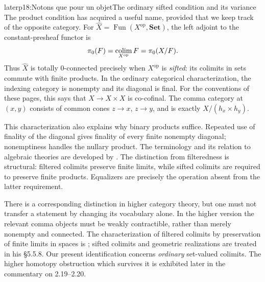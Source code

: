 \begin{dcomment}{later}{p18:Notons que pour un objet}{The ordinary sifted condition and its variance}
The product condition has acquired a useful name, provided that we keep track of the opposite category. For $\widehat X=\operatorname{Fun}(X^{\mathrm{op}},\mathbf {Set})$, the left adjoint to the constant-presheaf functor is
\[
 \pi _0(F)=\mathop{\rm colim}_{X^{\mathrm{op}}}F
          =\pi _0(X/F).
\]
Thus $\widehat X$ is totally $0$-connected precisely when $X^{\mathrm{op}}$ is \emph{sifted}: its colimits in sets commute with finite products. In the ordinary categorical characterization, the indexing category is nonempty and its diagonal is final. For the conventions of these pages, this says that $X\to X\times X$ is co-cofinal. The comma category at $(x,y)$ consists of common cones $z\to x$, $z\to y$, and is exactly $X/(h_x\times h_y)$.

This characterization also explains why binary products suffice. Repeated use of finality of the diagonal gives finality of every finite nonempty diagonal; nonemptiness handles the nullary product. The terminology and its relation to algebraic theories are developed by \citet{AdamekRosickyVitale2010}. The distinction from filteredness is structural: filtered colimits preserve finite limits, while sifted colimits are required to preserve finite products. Equalizers are precisely the operation absent from the latter requirement.

There is a corresponding distinction in higher category theory, but one must not transfer a statement by changing its vocabulary alone. In the higher version the relevant comma objects must be weakly contractible, rather than merely nonempty and connected. The characterization of filtered colimits by preservation of finite limits in spaces is \citet[Proposition 5.3.3.3]{Lurie2009HTT}; sifted colimits and geometric realizations are treated in his \S5.5.8. Our present identification concerns \emph{ordinary} set-valued colimits. The higher homotopy obstruction which survives it is exhibited later in the commentary on 2.19--2.20.
\end{dcomment}

